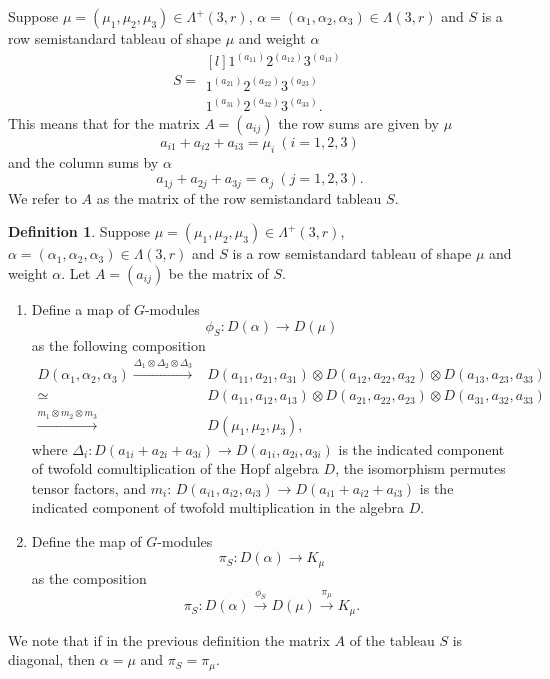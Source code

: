 \documentclass[11pt]{amsart}
\theoremstyle{definition}
\newtheorem{defn}[thm]{Definition}
\numberwithin{equation}{section}
\begin{document}
Suppose $\mu=(\mu_1,\mu_2,\mu_3) \in \Lambda^+(3,r)$, $\alpha=(\alpha_1,\alpha_2,\alpha_3) \in \Lambda(3,r)$ and $S$ is a row semistandard tableau of shape $\mu$ and weight $\alpha$
\[ S=\begin{matrix*}[l]
	1^{(a_{11})} 2^{(a_{12})} 3^{(a_{13})} \\
	1^{(a_{21})} 2^{(a_{22})} 3^{(a_{23})}\\
	1^{(a_{31})} 2^{(a_{32})} 3^{(a_{33})}. \end{matrix*}\]
This means that for the matrix $A=(a_{ij})$ the row sums are given by $\mu$ 
\[a_{i1}+a_{i2}+a_{i3}=\mu_i \ (i=1,2,3)\]
and the column sums by $\alpha$
\[a_{1j}+a_{2j}+a_{3j}=\alpha_j \ (j=1,2,3).\] We refer to $A$ as the matrix of the row semistandard tableau $S$. \begin{defn}\label{phiS}Suppose $\mu=(\mu_1,\mu_2,\mu_3) \in \Lambda^+(3,r)$, $\alpha=(\alpha_1,\alpha_2,\alpha_3) \in \Lambda(3,r)$ and $S$ is a row semistandard tableau of shape $\mu$ and weight $\alpha$. Let $A=(a_{ij})$ be the matrix of $S$. 
	
	\begin{enumerate} \item Define a map of $G$-modules \[\phi_S : D(\alpha) \to D{(\mu)}\] as the following composition
\begin{align}\label{phis} D(\alpha_1, \alpha_2, \alpha_3) \xrightarrow{\Delta_1\otimes \Delta_2 \otimes \Delta_3}& D(a_{11},a_{21},a_{31}) \otimes D(a_{12},a_{22},a_{32}) \otimes D(a_{13},a_{23},a_{33}) \\\nonumber \simeq &D(a_{11},a_{12},a_{13}) \otimes D(a_{21},a_{22},a_{23}) \otimes D(a_{31},a_{32},a_{33}) \\\nonumber\xrightarrow{m_1 \otimes m_2 \otimes m_3 }& D(\mu_1, \mu_2, \mu_3),
\end{align}
where $\Delta_i : D(a_{1i}+a_{2i}+a_{3i}) \to D(a_{1i}, a_{2i}, a_{3i})$ is the indicated component of twofold comultiplication of the Hopf algebra $D$,  the isomorphism permutes tensor factors, and $m_i $: $D(a_{i1}, a_{i2}, a_{i3}) \to D(a_{i1}+a_{i2}+a_{i3})$ is the indicated component of twofold multiplication in the algebra $D$. 
\item Define the map of $G$-modules \[\pi_S : D(\alpha) \to K_\mu\] as the composition \[\pi_S : D(\alpha) \xrightarrow{\phi_S} D(\mu) \xrightarrow{\pi_\mu} K_\mu.\]
\end{enumerate}\end{defn}

We note that if in the previous definition the matrix $A$ of the tableau $S$ is diagonal, then $\alpha = \mu$ and $\pi_S = \pi_\mu$. 
\end{document}
